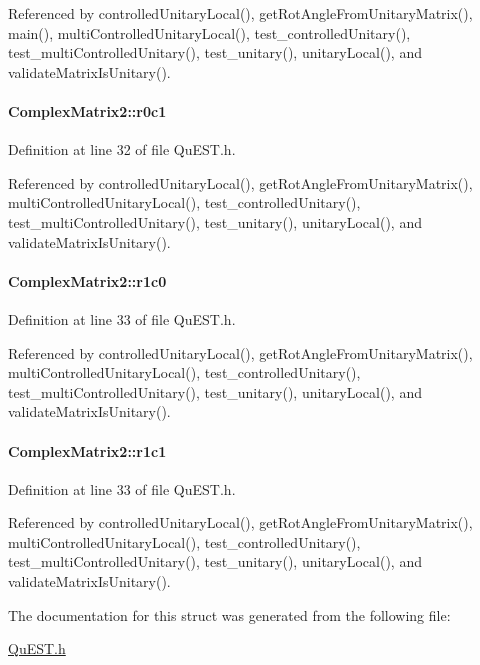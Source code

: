 Referenced by controlledUnitaryLocal(), getRotAngleFromUnitaryMatrix(), main(), multiControlledUnitaryLocal(), test\_\-controlledUnitary(), test\_\-multiControlledUnitary(), test\_\-unitary(), unitaryLocal(), and validateMatrixIsUnitary().\hypertarget{structComplexMatrix2_a0f3932f055a8b05cef361bce25d51172}{
\paragraph[{r0c1}]{ {\bf ComplexMatrix2::r0c1}}\hfill}
\label{structComplexMatrix2_a0f3932f055a8b05cef361bce25d51172}


Definition at line 32 of file QuEST.h.

Referenced by controlledUnitaryLocal(), getRotAngleFromUnitaryMatrix(), multiControlledUnitaryLocal(), test\_\-controlledUnitary(), test\_\-multiControlledUnitary(), test\_\-unitary(), unitaryLocal(), and validateMatrixIsUnitary().\hypertarget{structComplexMatrix2_ab98282015ed2065e53fbc9638e2583ab}{
\paragraph[{r1c0}]{ {\bf ComplexMatrix2::r1c0}}\hfill}
\label{structComplexMatrix2_ab98282015ed2065e53fbc9638e2583ab}


Definition at line 33 of file QuEST.h.

Referenced by controlledUnitaryLocal(), getRotAngleFromUnitaryMatrix(), multiControlledUnitaryLocal(), test\_\-controlledUnitary(), test\_\-multiControlledUnitary(), test\_\-unitary(), unitaryLocal(), and validateMatrixIsUnitary().\hypertarget{structComplexMatrix2_a763007c3070802373549ba0350f83c8a}{
\paragraph[{r1c1}]{ {\bf ComplexMatrix2::r1c1}}\hfill}
\label{structComplexMatrix2_a763007c3070802373549ba0350f83c8a}


Definition at line 33 of file QuEST.h.

Referenced by controlledUnitaryLocal(), getRotAngleFromUnitaryMatrix(), multiControlledUnitaryLocal(), test\_\-controlledUnitary(), test\_\-multiControlledUnitary(), test\_\-unitary(), unitaryLocal(), and validateMatrixIsUnitary().

The documentation for this struct was generated from the following file:\begin{DoxyCompactItemize}
\item 
\hyperlink{QuEST_8h}{QuEST.h}\end{DoxyCompactItemize}
